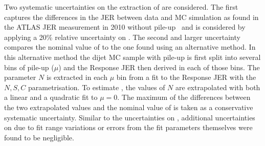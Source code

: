 Two systematic uncertainties on the extraction of \Nmuzero are considered. The first captures the differences in the JER between data and MC simulation as found in the ATLAS JER measurement in 2010 without pile-up~\cite{PERF-2011-04} and is considered by applying a 20\% relative uncertainty on \Nmuzero. The second and larger uncertainty compares the nominal value of \Nmuzero to the one found using an alternative method. In this alternative method the dijet MC sample with pile-up is first split into several bins of pile-up ($\mu$) and the Response JER then derived in each of those bins. The parameter $N$ is extracted in each $\mu$ bin from a fit to the Response JER with the $N, S, C$ parametrisation. To estimate \Nmuzero, the values of $N$ are extrapolated with both a linear and a quadratic fit to $\mu=0$. The maximum of the differences between the two extrapolated values and the nominal value of \Nmuzero is taken as a conservative systematic uncertainty.
Similar to the uncertainties on \Npileup, additional uncertainties on \Nmuzero due to fit range variations or errors from the fit parameters themselves were found to be negligible.



